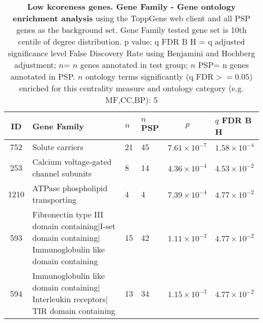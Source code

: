  \begin{table}[ht]
\centering
\begin{adjustbox}{width=\textwidth}
\setlength{\extrarowheight}{2pt}
\begin{tabular}{@{}clllcl@{}}
  \toprule
  ID & Gene Family & $n$ & $n$ PSP & $p$ & $q$ FDR B H \\ 

  \midrule
752 & Solute carriers & 21 & 45 & $7.61 \times 10^{-7}$ & $1.58 \times 10^{-4}$ \\ 
  253 & Calcium voltage-gated channel subunits & 8 & 14 & $4.36 \times 10^{-4}$ & $4.53 \times 10^{-2}$ \\ 
  1210 & ATPase phospholipid transporting & 4 & 4 & $7.39 \times 10^{-4}$ & $4.77 \times 10^{-2}$ \\ 
  593 & \makecell{Fibronectin type III domain containing$|$I-set domain containing$|$\\Immunoglobulin like domain containing} & 15 & 42 & $1.11 \times 10^{-3}$ & $4.77 \times 10^{-2}$ \\ 
  594 & \makecell{Immunoglobulin like domain containing$|$Interleukin receptors$|$\\TIR domain containing} & 13 & 34 & $1.15 \times 10^{-3}$ & $4.77 \times 10^{-2}$ \\ 
   \hline
\end{tabular}
\end{adjustbox}
\caption[Gene ontology enrichment Low kcoreness genes Gene Family of genes above 90th centile of distribution]{\textbf{Low kcoreness genes. Gene Family - Gene ontology enrichment analysis} using the ToppGene web client and all PSP genes as the background set.  Gene Family tested gene set is 10th centile of degree distribution.  p value; q FDR B H = q adjusted significance level False Discovery Rate using Benjamini and Hochberg adjustment; $n$= $n$ genes annotated in test group; $n$ PSP= n genes annotated in PSP. $n$ ontology terms significantly (q FDR$>=0.05$) enriched for this centrality measure and ontology category (e.g. MF,CC,BP): 5} 
\label{tab:ToppGENE Gene Family. kco 10 centile cwpsp.txtp = p value; q FDR B H = q adjusted significance level False Discovery Rate using Benjamini and Hochberg adjustment; n= n genes annotated in test group; n PSP= n genes annotated in PSP. n significant in category 5}
\end{table}
